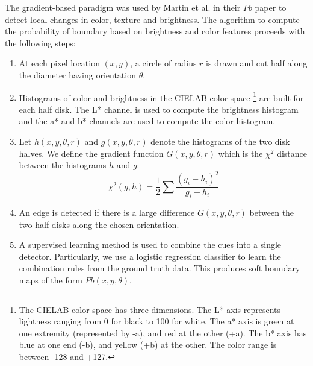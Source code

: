 \documentclass{SMBV12}
\begin{document}
The gradient-based paradigm was used by Martin et al. in their $Pb$ paper \cite{martin2004learning} to detect local changes in color, texture and brightness. The algorithm to compute the probability of boundary based on brightness and color features proceeds with the following steps:
\begin{enumerate}
\item At each pixel location $(x, y)$, a circle of radius $r$ is drawn and cut half along the diameter having orientation $\theta$.
\item Histograms of color and brightness in the CIELAB color space \footnote{The CIELAB color space has three dimensions. The L* axis represents lightness ranging from 0 for black to 100 for white. The a* axis is green at one extremity (represented by -a), and red at the other (+a). The b* axis has blue at one end (-b), and yellow (+b) at the other. The color range is between -128 and +127.} are built for each half disk. The L* channel is used to compute the brightness histogram and the a* and b* channels are used to compute the color histogram. 
\item Let $h(x, y, \theta, r)$ and $g(x, y, \theta, r)$ denote the histograms of the two disk halves. We define the gradient function $G(x, y, \theta, r)$ which is the $\chi^2$ distance between the histograms $h$ and $g$:
\begin{equation}
	\chi^2(g, h) = \frac{1}{2} \sum \dfrac{(g_i - h_i)^2}{g_i + h_i}
\end{equation}
\item An edge is detected if there is a large difference $G(x, y, \theta, r)$ between the two half disks along the chosen orientation.
\item A supervised learning method is used to combine the cues into a single detector. Particularly, we use a logistic regression classifier to learn the combination rules from the ground truth data. This produces soft boundary maps of the form $Pb(x, y, \theta)$.
\end{enumerate}   
\end{document}
